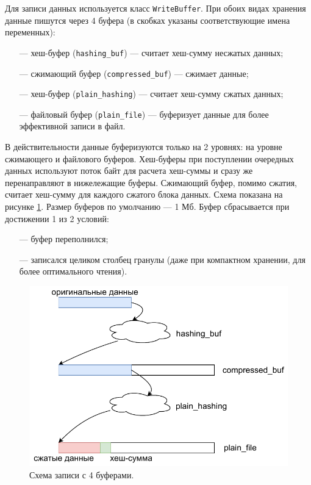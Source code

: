 Для записи данных используется класс \texttt{WriteBuffer}. При обоих видах хранения данные пишутся через 4 буфера (в скобках указаны соответствующие имена переменных):
\begin{itemize}
    \item [---] хеш-буфер (\texttt{hashing\_buf}) \cite{hashingbuf} --- считает хеш-сумму несжатых данных;
    \item [---] сжимающий буфер (\texttt{compressed\_buf}) \cite{compressingbuf} --- сжимает данные;
    \item [---] хеш-буфер (\texttt{plain\_hashing}) \cite{hashingbuf} --- считает хеш-сумму сжатых данных;
    \item [---] файловый буфер (\texttt{plain\_file}) \cite{filebuf} --- буферизует данные для более эффективной записи в файл.
\end{itemize}

В действительности данные буферизуются только на 2 уровнях: на уровне сжимающего и файлового буферов. Хеш-буферы при поступлении очередных данных используют поток байт для расчета хеш-суммы и сразу же перенаправляют в нижележащие буферы. Сжимающий буфер, помимо сжатия, считает хеш-сумму для каждого сжатого блока данных. Схема показана на рисунке \ref{fig:bufscheme}. Размер буферов по умолчанию --- 1 Мб. Буфер сбрасывается при достижении 1 из 2 условий:
\begin{itemize}
	\item [---] буфер переполнился;
	\item [---] записался целиком столбец гранулы (даже при компактном хранении, для более оптимального чтения).
\end{itemize}

\begin{figure}[hbtp]
	\centering
	\includegraphics[width=\textwidth]{img/bufscheme.pdf}
	\caption{Схема записи с 4 буферами.}
	\label{fig:bufscheme}
\end{figure}

